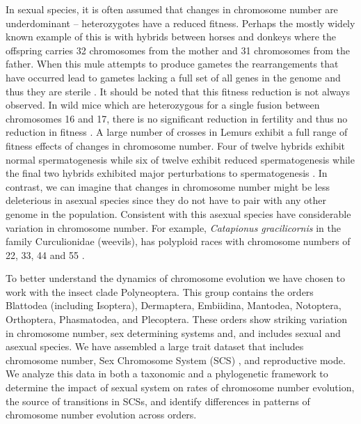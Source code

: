 In sexual species, it is often assumed that changes in chromosome number are underdominant \citep{white1973} -- heterozygotes have a reduced fitness. 
Perhaps the mostly widely known example of this is with hybrids between horses and donkeys where the offspring carries 32 chromosomes from the mother and 31 chromosomes from the father. 
When this mule attempts to produce gametes the rearrangements that have occurred lead to gametes lacking a full set of all genes in the genome and thus they are sterile \citep{wodsedalek1916}. 
It should be noted that this fitness reduction is not always observed.
In wild mice which are heterozygous for a single fusion between chromosomes 16 and 17, there is no significant reduction in fertility and thus no reduction in fitness \citep{britton1990robertsonian}.
A large number of crosses in Lemurs exhibit a full range of fitness effects of changes in chromosome number.
Four of twelve hybrids exhibit normal spermatogenesis while six of twelve exhibit reduced spermatogenesis while the final two hybrids exhibited major perturbations to spermatogenesis \citep{ratomponirina1988}.   
In contrast, we can imagine that changes in chromosome number might be less deleterious in asexual species since they do not have to pair with any other genome in the population.
Consistent with this asexual species have considerable variation in chromosome number. 
For example, \textit{Catapionus gracilicornis} in the family Curculionidae (weevils), has polyploid races with chromosome numbers of 22, 33, 44 and 55 \citep{lachowska1998}. 

To better understand the dynamics of chromosome evolution we have chosen to work with the insect clade Polyneoptera.
This group contains the orders Blattodea (including Isoptera), Dermaptera, Embiidina, Mantodea, Notoptera, Orthoptera, Phasmatodea, and Plecoptera.
These orders show striking variation in chromosome number, sex determining systems and, and includes sexual and asexual species. 
We have assembled a large trait dataset that includes chromosome number, Sex Chromosome System (SCS) , and reproductive mode.
We analyze this data in both a taxonomic and a phylogenetic framework to determine the impact of sexual system on rates of chromosome number evolution, the source of transitions in SCSs, and identify differences in patterns of chromosome number evolution across orders.
 
